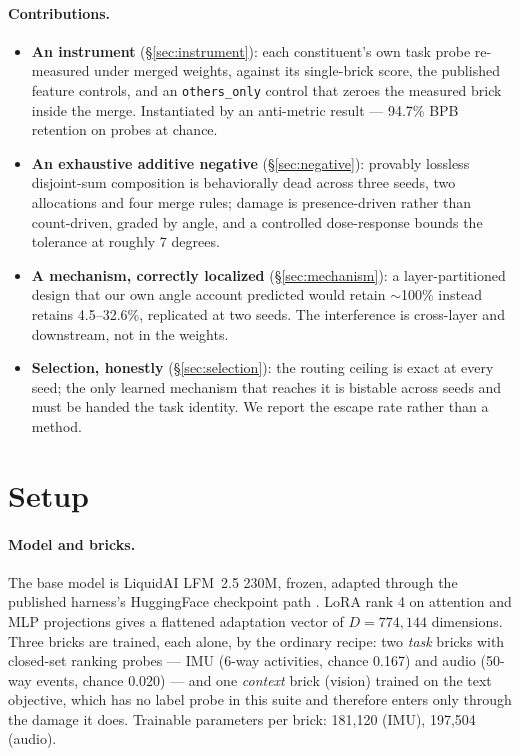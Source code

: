 \documentclass[11pt]{article}
\begin{document}
\paragraph{Contributions.}
\begin{itemize}
  \item \textbf{An instrument} (\S\ref{sec:instrument}): each constituent's own task probe re-measured under merged weights, against its single-brick score, the published feature controls, and an \texttt{others\_only} control that zeroes the measured brick inside the merge. Instantiated by an anti-metric result --- 94.7\% BPB retention on probes at chance.
  \item \textbf{An exhaustive additive negative} (\S\ref{sec:negative}): provably lossless disjoint-sum composition is behaviorally dead across three seeds, two allocations and four merge rules; damage is presence-driven rather than count-driven, graded by angle, and a controlled dose-response bounds the tolerance at roughly 7 degrees.
  \item \textbf{A mechanism, correctly localized} (\S\ref{sec:mechanism}): a layer-partitioned design that our own angle account predicted would retain $\sim$100\% instead retains 4.5--32.6\%, replicated at two seeds. The interference is cross-layer and downstream, not in the weights.
  \item \textbf{Selection, honestly} (\S\ref{sec:selection}): the routing ceiling is exact at every seed; the only learned mechanism that reaches it is bistable across seeds and must be handed the task identity. We report the escape rate rather than a method.
\end{itemize}

\section{Setup}
\label{sec:setup}
\paragraph{Model and bricks.}
The base model is LiquidAI LFM~2.5 230M, frozen, adapted through the published harness's HuggingFace checkpoint path \cite{penov2026note}. LoRA rank 4 on attention and MLP projections gives a flattened adaptation vector of $D = 774,144$ dimensions. Three bricks are trained, each alone, by the ordinary recipe: two \emph{task} bricks with closed-set ranking probes --- IMU (6-way activities, chance 0.167) and audio (50-way events, chance 0.020) --- and one \emph{context} brick (vision) trained on the text objective, which has no label probe in this suite and therefore enters only through the damage it does. Trainable parameters per brick: 181,120 (IMU), 197,504 (audio).
\end{document}
